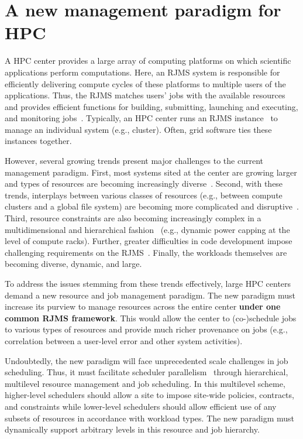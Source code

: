 \section{A new management paradigm for HPC}
\label{label:paradigm}
A HPC center provides a large array of computing
platforms on which scientific applications perform
computations.
Here, an RJMS system is responsible for efficiently delivering 
compute cycles of these platforms
to multiple users of the applications. 
Thus, the RJMS matches users' jobs with the available 
resources and provides efficient functions 
for building, submitting, launching and executing, 
and monitoring jobs~\cite{GeorgiouThesis}. 
Typically, an HPC center runs an RJMS instance~\cite{Jette02slurm} 
to manage an individual system (e.g., cluster). Often,
grid software ties these instances together. 

However, several growing trends present major challenges 
to the current management paradigm. 
First, most systems sited at the center are growing larger 
and types of resources are becoming increasingly diverse~\cite{GeorgiouThesis}. 
Second, with these trends, interplays between 
various classes of resources
(e.g., between compute clusters and a global file system)
are becoming more complicated and disruptive~\cite{SCR,SPINDLE}. 
Third, resource constraints are also becoming increasingly
complex in a multidimensional and hierarchical fashion~\cite{power-overprovision}
(e.g., dynamic power capping at the level of compute racks).
Further, greater difficulties in code development
impose challenging requirements on the RJMS~\cite{STAT,SPINDLE,PRUNER,SCR,launchmon}.
Finally, the workloads themselves are becoming 
diverse, dynamic, and large.

To address the issues stemming from these trends effectively,
large HPC centers demand a new resource and job management paradigm.
The new paradigm must increase its purview
to manage resources across the entire center
{\bf under one common RJMS framework}.
This would allow the center to (co-)schedule jobs 
to various types of resources and 
provide much richer provenance on jobs (e.g., correlation between
a user-level error and other system activities).

Undoubtedly, the new paradigm will face unprecedented scale challenges
in job scheduling. Thus, it must facilitate scheduler
parallelism~\cite{Omega,Mesos} through hierarchical,
multilevel resource management and job scheduling.
In this multilevel scheme, higher-level schedulers
should allow a site to impose site-wide policies, contracts,
and constraints while lower-level schedulers should allow
efficient use of any subsets of resources in accordance with
workload types.
The new paradigm must dynamically support arbitrary levels in
this resource and job hierarchy.

